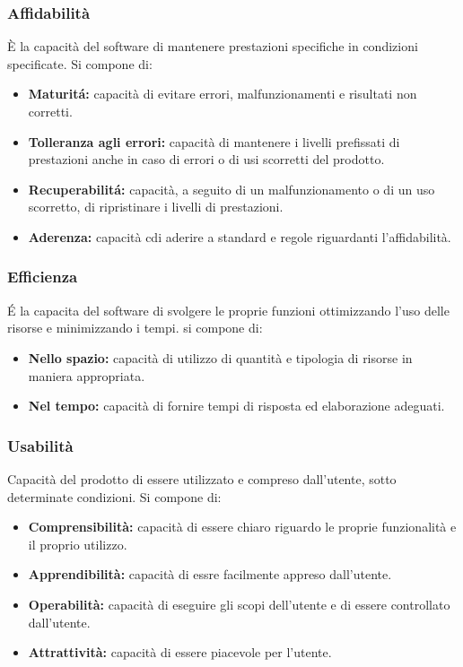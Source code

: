 \subsubsection{Affidabilit\`a}
\`E la capacit\`a del software di mantenere prestazioni specifiche in condizioni specificate.
Si compone di:
\begin{itemize}
    \item \textbf{Maturit\'a: }capacit\`a di evitare errori, malfunzionamenti e risultati non corretti.
    \item \textbf{Tolleranza agli errori: }capacit\`a di mantenere i livelli prefissati di prestazioni anche in caso di errori o di usi scorretti del prodotto.
    \item \textbf{Recuperabilit\'a: }capacit\`a, a seguito di un malfunzionamento o di un uso scorretto, di ripristinare i livelli di prestazioni.
    \item \textbf{Aderenza: }capacit\`a cdi aderire a standard e regole riguardanti l'affidabilit\`a.
\end{itemize}
\subsubsection{Efficienza}
\'E la capacita del software di svolgere le proprie funzioni ottimizzando l'uso delle risorse e minimizzando i tempi. si compone di:
\begin{itemize}
    \item  \textbf{Nello spazio: }capacit\`a di utilizzo di quantit\`a e tipologia di risorse in maniera appropriata.
    \item  \textbf{Nel tempo: }capacit\`a di fornire tempi di risposta ed elaborazione adeguati.
\end{itemize}
\subsubsection{Usabilit\`a}
Capacit\`a del prodotto di essere utilizzato e compreso dall'utente, sotto determinate condizioni. Si compone di:
\begin{itemize}
    \item \textbf{Comprensibilit\`a: }capacit\`a di essere chiaro riguardo le proprie funzionalit\`a e il proprio utilizzo.
    \item \textbf{Apprendibilit\`a: }capacit\`a di essre facilmente appreso dall'utente.
    \item \textbf{Operabilit\`a: }capacit\`a di eseguire gli scopi dell'utente e di essere controllato dall'utente.
    \item \textbf{Attrattivit\`a: }capacit\`a di essere piacevole per l'utente.
\end{itemize}
